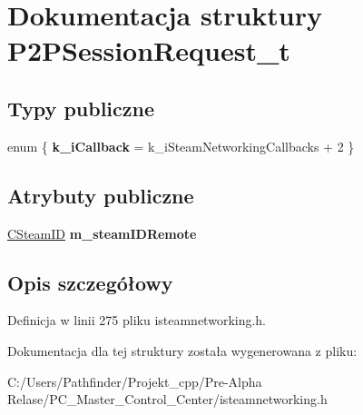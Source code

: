 \hypertarget{struct_p2_p_session_request__t}{}\section{Dokumentacja struktury P2\+P\+Session\+Request\+\_\+t}
\label{struct_p2_p_session_request__t}
\subsection*{Typy publiczne}
\begin{DoxyCompactItemize}
\item 
\mbox{\label{struct_p2_p_session_request__t_ab672c8be3cc10c116c77feb021776ab3}} 
enum \{ {\bfseries k\+\_\+i\+Callback} = k\+\_\+i\+Steam\+Networking\+Callbacks + 2
 \}
\end{DoxyCompactItemize}
\subsection*{Atrybuty publiczne}
\begin{DoxyCompactItemize}
\item 
\mbox{\label{struct_p2_p_session_request__t_ad307bad261d06d24bbb70549e3203b67}} 
\hyperlink{class_c_steam_i_d}{C\+Steam\+ID} {\bfseries m\+\_\+steam\+I\+D\+Remote}
\end{DoxyCompactItemize}


\subsection{Opis szczegółowy}


Definicja w linii 275 pliku isteamnetworking.\+h.



Dokumentacja dla tej struktury została wygenerowana z pliku\+:\begin{DoxyCompactItemize}
\item 
C\+:/\+Users/\+Pathfinder/\+Projekt\+\_\+cpp/\+Pre-\/\+Alpha Relase/\+P\+C\+\_\+\+Master\+\_\+\+Control\+\_\+\+Center/isteamnetworking.\+h\end{DoxyCompactItemize}
